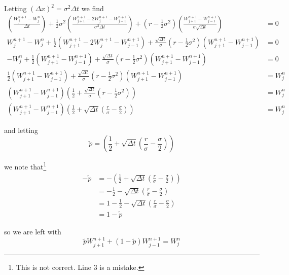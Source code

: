 \documentclass[12pt]{article}
\begin{document}
Letting $(\Delta x)^2 = \sigma^2\Delta t$ we find
\begin{align*}
	\left(\frac{W^{n + 1}_j - W^n_j}{\Delta t}\right) + \frac{1}{2}\sigma^2 \left( \frac{W^{n + 1}_{j + 1} - 2W^{n + 1}_j - W^{n + 1}_{j - 1}}{ \sigma^2\Delta t } \right) + \left(r - \frac{1}{2}\sigma^2 \right) \left( \frac{W^{n + 1}_{j + 1} - W^{n + 1}_{j - 1}}{ \sigma\sqrt{\Delta t} } \right) &= 0 \\
	W^{n + 1}_j - W^n_j + \frac{1}{2} \left( W^{n + 1}_{j + 1} - 2W^{n + 1}_j - W^{n + 1}_{j - 1} \right) + \frac{\sqrt{\Delta t}}{\sigma}\left(r - \frac{1}{2}\sigma^2 \right) \left( W^{n + 1}_{j + 1} - W^{n + 1}_{j - 1} \right) &= 0 \\
	- W^n_j + \frac{1}{2} \left( W^{n + 1}_{j + 1}- W^{n + 1}_{j - 1} \right) + \frac{\sqrt{\Delta t}}{\sigma}\left(r - \frac{1}{2}\sigma^2 \right) \left( W^{n + 1}_{j + 1} - W^{n + 1}_{j - 1} \right) &= 0 \\
	\frac{1}{2} \left( W^{n + 1}_{j + 1}- W^{n + 1}_{j - 1} \right) + \frac{\sqrt{\Delta t}}{\sigma}\left(r - \frac{1}{2}\sigma^2 \right) \left( W^{n + 1}_{j + 1} - W^{n + 1}_{j - 1} \right) &= W^n_j \\
	\left( W^{n + 1}_{j + 1} - W^{n + 1}_{j - 1} \right) \left( \frac{1}{2} + \frac{\sqrt{\Delta t}}{\sigma}\left(r - \frac{1}{2}\sigma^2 \right) \right) &= W^n_j \\
	\left( W^{n + 1}_{j + 1} - W^{n + 1}_{j - 1} \right) \left( \frac{1}{2} + \sqrt{\Delta t} \left( \frac{r}{\sigma} - \frac{\sigma}{2} \right) \right) &= W^n_j 
\end{align*}

and letting
\begin{equation*}
	\tilde{p} = \left( \frac{1}{2} + \sqrt{\Delta t}\left( \frac{r}{\sigma} - \frac{\sigma}{2} \right) \right)
\end{equation*}

we note that\footnote{This is not correct. Line 3 is a mistake.}
\begin{align*}
	-\tilde{p} &= -\left( \frac{1}{2} + \sqrt{\Delta t} \left( \frac{r}{\sigma} - \frac{\sigma}{2} \right) \right) \\
	&= -\frac{1}{2} - \sqrt{\Delta t} \left( \frac{r}{\sigma} - \frac{\sigma}{2} \right) \\
	&= 1 - \frac{1}{2} - \sqrt{\Delta t} \left( \frac{r}{\sigma} - \frac{\sigma}{2} \right) \\
	&= 1 - \tilde{p}
\end{align*}

so we are left with
\begin{equation*}
	\tilde{p}W^{n + 1}_{j + 1} + (1 - \tilde{p}) W^{n + 1}_{j - 1} = W^n_j 
\end{equation*}
\end{document}
